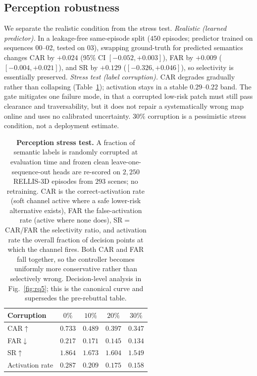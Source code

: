 \subsection{Perception robustness}
\label{app:perception}
We separate the realistic condition from the stress test.
\emph{Realistic (learned predictor).} In a leakage-free same-episode split
($450$ episodes; predictor trained on sequences 00--02, tested on 03), swapping
ground-truth for predicted semantics changes CAR by $+0.024$
(95\% CI $[-0.052,+0.003]$), FAR by $+0.009$ ($[-0.004,+0.021]$), and SR by
$+0.129$ ($[-0.326,+0.046]$), so selectivity is essentially preserved.
\emph{Stress test (label corruption).} CAR degrades gradually rather than
collapsing (Table~\ref{tab:app_perception}); activation stays in a stable
$0.29$--$0.22$ band. The gate mitigates one failure mode, in that a corrupted
low-risk patch must still pass clearance and traversability, but it does not
repair a systematically wrong map online and uses no calibrated uncertainty.
$30\%$ corruption is a pessimistic stress condition, not a deployment estimate.

\begin{table}[htbp]
\centering
\caption{\textbf{Perception stress test.} A fraction of semantic labels is
randomly corrupted at evaluation time and frozen clean leave-one-sequence-out
heads are re-scored on $2{,}250$ RELLIS-3D episodes from $293$ scenes; no
retraining. CAR is the correct-activation rate (soft channel active where a
safe lower-risk alternative exists), FAR the false-activation rate (active
where none does), SR${=}$CAR/FAR the selectivity ratio, and activation rate the
overall fraction of decision points at which the channel fires. Both CAR and
FAR fall together, so the controller becomes uniformly more conservative rather
than selectively wrong. Decision-level analysis in Fig.~\ref{fig:rq5}; this is
the canonical curve and supersedes the pre-rebuttal table.}
\label{tab:app_perception}
\small\setlength{\tabcolsep}{7pt}\renewcommand{\arraystretch}{1.1}
\begin{tabular}{lcccc}
\toprule
Corruption & $0\%$ & $10\%$ & $20\%$ & $30\%$ \\
\midrule
CAR$\uparrow$ & $0.733$ & $0.489$ & $0.397$ & $0.347$ \\
FAR$\downarrow$ & $0.217$ & $0.171$ & $0.145$ & $0.134$ \\
SR$\uparrow$ & $1.864$ & $1.673$ & $1.604$ & $1.549$ \\
Activation rate & $0.287$ & $0.209$ & $0.175$ & $0.158$ \\
\bottomrule
\end{tabular}
\end{table}


